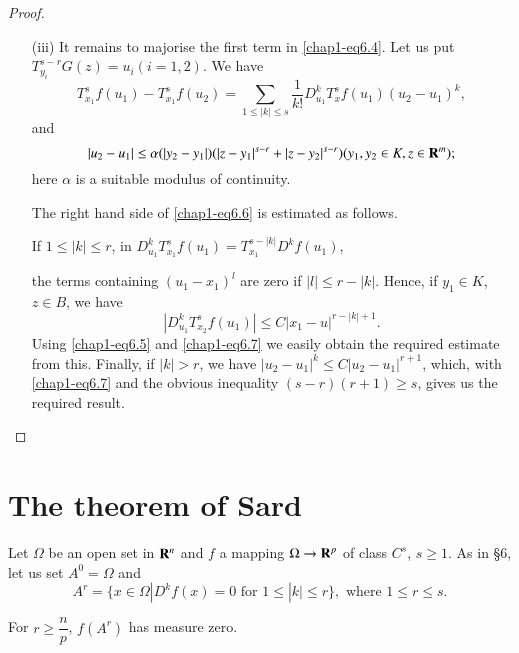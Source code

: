 \begin{proof}
\begin{itemize}
\item[(iii)] It remains to majorise the first term in \eqref{chap1-eq6.4}. Let us put $T^{s-r}_{y_{i}}G(z)=u_{i}(i=1,2)$. We have
\begin{equation}
T^{s}_{x_{1}}f(u_{1})-T^{s}_{x_{1}}f(u_{2})=\sum\limits_{1\leq |k|\leq s}\dfrac{1}{k!}D^{k}_{u_{1}}T^{s}_{x}f(u_{1})(u_{2}-u_{1})^{k},\label{chap1-eq6.6}
\end{equation}
and
\begin{equation}
|u_{2}-u_{1}|\leq \alpha(|y_{2}-y_{1}|)(|z-y_{1}|^{s-r}+|z-y_{2}|^{s-r})(y_{1},y_{2}\in K, z\in \mathbf{R}^{m});\label{chap1-eq6.7}
\end{equation}
here $\alpha$ is a suitable modulus of continuity.

The right hand side of \eqref{chap1-eq6.6} is estimated as follows.

If $1\leq |k|\leq r$, in $D^{k}_{u_{1}}T^{s}_{x_{1}}f(u_{1})=T^{s-|k|}_{x_{1}}D^{k}f(u_{1})$,

the terms containing $(u_{1}-x_{1})^{l}$ are zero if $|l|\leq r-|k|$. Hence, if $y_{1}\in K$, $z\in B$, we have
$$
|D^{k}_{u_{1}}T^{s}_{x_{2}}f(u_{1})|\leq C|x_{1}-u|^{r-|k|+1}.
$$
Using \eqref{chap1-eq6.5} and \eqref{chap1-eq6.7} we easily obtain the required estimate from this. Finally, if $|k|>r$, we have $|u_{2}-u_{1}|^{k}\leq C|u_{2}-u_{1}|^{r+1}$, which, with \eqref{chap1-eq6.7} and the obvious inequality $(s-r)(r+1)\geq s$, gives us the required result.
\end{itemize}
\end{proof}

\section{The theorem of Sard}\label{chap1-sec7}

Let $\Omega$ be an open set in $\mathbf{R}^{n}$ and $f$ a mapping $\Omega\to \mathbf{R}^{p}$ of class $C^{s}$, $s\geq 1$. As in \S6, let us set $A^{0}=\Omega$ and 
$$
A^{r}=\{x\in \Omega|D^{k}f(x)=0\text{ for } 1\leq |k|\leq r\}, \text{ where } 1\leq r\leq s.
$$

\begin{lemma}\label{chap1-lem7.1}
For $r\geq \dfrac{n}{p}$, $f(A^{r})$ has measure zero.
\end{lemma}

